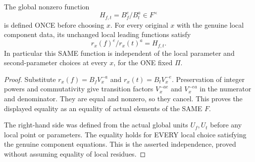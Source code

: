 \begin{theorem}
\label{thm:gauss-leading-whole-curve-quotient}
\leanok
The global nonzero function
\[
 H_{f,t}=B_f^e/B_t^a\in F^\times
\]
is defined ONCE before choosing $x$. For every original $x$ with the
genuine local component data, its unchanged local leading functions satisfy
\[
 r_x(f)^e/r_x(t)^a=H_{f,t}.
\]
In particular this SAME function is independent of the local parameter
and second-parameter choices at every $x$, for the ONE fixed $\Pi$.
\end{theorem}
\begin{proof}
Substitute $r_x(f)=B_fV_x^{-a}$ and $r_x(t)=B_tV_x^{-e}$.
Preservation of integer powers and commutativity give transition factors
$V_x^{-ae}$ and $V_x^{-ea}$ in the numerator and denominator. They
are equal and nonzero, so they cancel. This proves the displayed equality
as an equality of actual elements of the SAME $F$.

The right-hand side was defined from the actual global units $U_f,U_t$
before any local point or parameters. The equality holds for EVERY local
choice satisfying the genuine component equations. This is the asserted
independence, proved without assuming equality of local residues.
\end{proof}

